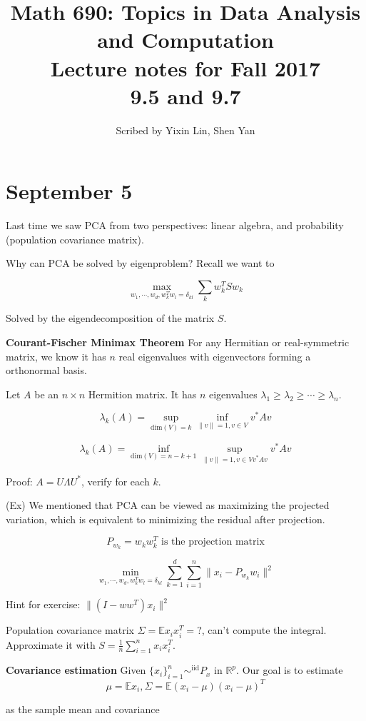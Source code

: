 \documentclass[12pt]{article}
\title{Math 690: Topics in Data Analysis and Computation\\ \large Lecture notes for Fall 2017\\ 9.5 and 9.7}
\date{}
\author{\small Scribed by Yixin Lin, Shen Yan}
\theoremstyle{plain}
\begin{document}
\maketitle



\part*{September 5}

Last time we saw PCA from two perspectives: linear algebra, and probability (population covariance matrix).

Why can PCA be solved by eigenproblem? Recall we want to

$$ \max_{w_1, \cdots, w_d, w_k^T w_l = \delta_{kl}} \sum_{k} w_k^T S w_k $$

Solved by the eigendecomposition of the matrix $S$.

\textbf{Courant-Fischer Minimax Theorem} For any Hermitian or real-symmetric matrix, we know it has $n$ real eigenvalues with eigenvectors forming a orthonormal basis.

Let $A$ be an $n \times n$ Hermition matrix. It has $n$ eigenvalues $\lambda_1 \geq \lambda_2 \geq \cdots \geq \lambda_n$.

$$ \lambda_k(A) = \sup_{\text{dim}(V) = k} \inf_{\| v \| = 1, v \in V} v^*A v $$

$$ \lambda_k(A) = \inf_{\text{dim}(V) = n - k + 1} \sup_{\| v \| = 1, v \in V v^* A v } v^*Av$$

Proof: $A = U \Lambda U^*$, verify for each $k$.

(Ex) We mentioned that PCA can be viewed as maximizing the projected variation, which is equivalent to minimizing the residual after projection.

$$ P_{w_k} = w_k w_k^T \text{ is the projection matrix} $$

$$ \min_{w_1, \cdots, w_d, w_k^T w_l = \delta_{kl} }  \sum_{k=1}^d \sum_{i=1}^n \| x_i - P_{w_k} w_i \|^2 $$

Hint for exercise: $\| (I-ww^T) x_i \|^2$

Population covariance matrix $\Sigma = \mathbb{E} x_i x_i^T = ?$, can't compute the integral. Approximate it with $S = \frac{1}{n} \sum_{i=1}^n x_i x_i^T$.

\textbf{Covariance estimation} Given $\{x_i\}_{i=1}^n \sim^\text{iid} P_x$ in $\mathbb{R}^p$. Our goal is to estimate $$\mu = \mathbb{E}x_i, \Sigma = \mathbb{E}(x_i-\mu)(x_i-\mu)^T$$

as the sample mean and covariance
\end{document}
